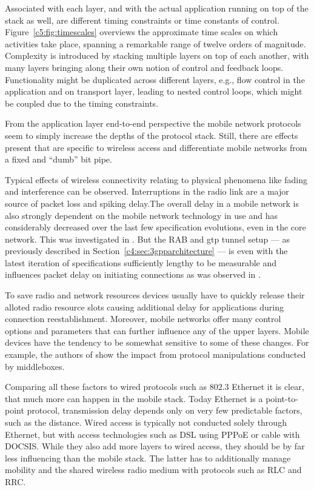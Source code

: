 Associated with each layer, and with the actual application running on top of the stack as well, are different timing constraints or time constants of control. Figure~\ref{c5:fig:timescales} overviews the approximate time scales on which activities take place, spanning a remarkable range of twelve orders of magnitude. Complexity is introduced by stacking multiple layers on top of each another, with many layers bringing along their own notion of control and feedback loops. Functionality might be duplicated across different layers, e.g., flow control in the application and on transport layer, leading to nested control loops, which might be coupled due to the timing constraints.

From the application layer end-to-end perspective the mobile network protocols seem to simply increase the depths of the protocol stack. Still, there are effects present that are specific to wireless access and differentiate mobile networks from a fixed and ``dumb'' bit pipe.

Typical effects of wireless connectivity relating to physical phenomena like fading and interference can be observed. Interruptions in the radio link are a major source of packet loss and spiking delay.The overall delay in a mobile network is also strongly dependent on the mobile network technology in use and has considerably decreased over the last few specification evolutions, even in the core network. This was investigated in \cite{laner2011dissecting3gdelay}. But the \gls{RAB} and \gls{gtp} tunnel setup --- as previously described in Section~\ref{c4:sec:3gpparchitecture} --- is even with the latest iteration of specifications sufficiently lengthy to be measurable and influences packet delay on initiating connections as was observed in \cite{arlos2010packetsizedelayinfluence}.

To save radio and network resources devices usually have to quickly release their alloted radio resource slots causing additional delay for applications during connection reestablishment. Moreover, mobile networks offer many control options and parameters that can further influence any of the upper layers. Mobile devices have the tendency to be somewhat sensitive to some of these changes. For example, the authors of \cite{sigcomm11middleboxes} show the impact from protocol manipulations conducted by middleboxes. 

Comparing all these factors to wired protocols such as 802.3 Ethernet it is clear, that much more can happen in the mobile stack. Today Ethernet is a point-to-point protocol, transmission delay depends only on very few predictable factors, such as the distance. Wired access is typically not conducted solely through Ethernet, but with access technologies such as \gls{DSL} using \gls{PPPoE} or cable with \gls{DOCSIS}. While they also add more layers to wired access, they should be by far less influencing than the mobile stack. The latter has to additionally manage mobility and the shared wireless radio medium with protocols such as \gls{RLC} and \gls{RRC}.

